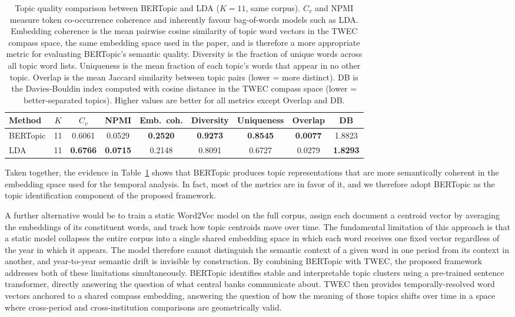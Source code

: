 \begin{table}[h!]
\centering
\small
\begin{tabular}{lcccccccc}
\toprule
Method & $K$ & $C_v$ & NPMI & Emb.\ coh. & Diversity & Uniqueness & Overlap & DB \\
\midrule
BERTopic & 11 & 0.6061 & 0.0529 & \textbf{0.2520} & \textbf{0.9273} & \textbf{0.8545} & \textbf{0.0077} & 1.8823 \\
LDA & 11 & \textbf{0.6766} & \textbf{0.0715} & 0.2148 & 0.8091 & 0.6727 & 0.0279 & \textbf{1.8293} \\
\bottomrule
\end{tabular}
\caption{Topic quality comparison between BERTopic and LDA ($K=11$, same corpus). $C_v$ and NPMI measure token co-occurrence coherence and inherently favour bag-of-words models such as LDA. Embedding coherence is the mean pairwise cosine similarity of topic word vectors in the TWEC compass space, the same embedding space used in the paper, and is therefore a more appropriate metric for evaluating BERTopic's semantic quality. Diversity is the fraction of unique words across all topic word lists. Uniqueness is the mean fraction of each topic's words that appear in no other topic. Overlap is the mean Jaccard similarity between topic pairs (lower = more distinct). DB is the Davies-Bouldin index \citep{davies1979cluster} computed with cosine distance in the TWEC compass space (lower = better-separated topics). Higher values are better for all metrics except Overlap and DB.}
\label{tab:coherence_comparison}
\end{table}

Taken together, the evidence in Table~\ref{tab:coherence_comparison} shows that BERTopic produces topic representations that are more semantically coherent in the embedding space used for the temporal analysis. In fact, most of the metrics are in favor of it, and we therefore adopt BERTopic as the topic identification component of the proposed framework.

A further alternative would be to train a static Word2Vec model on the full corpus, assign each document a centroid vector by averaging the embeddings of its constituent words, and track how topic centroids move over time. The fundamental limitation of this approach is that a static model collapses the entire corpus into a single shared embedding space in which each word receives one fixed vector regardless of the year in which it appears. The model therefore cannot distinguish the semantic context of a given word in one period from its context in another, and year-to-year semantic drift is invisible by construction. By combining BERTopic with TWEC, the proposed framework addresses both of these limitations simultaneously. BERTopic identifies stable and interpretable topic clusters using a pre-trained sentence transformer, directly answering the question of what central banks communicate about. TWEC then provides temporally-resolved word vectors anchored to a shared compass embedding, answering the question of how the meaning of those topics shifts over time in a space where cross-period and cross-institution comparisons are geometrically valid.

